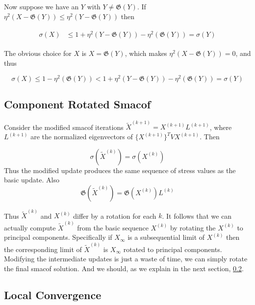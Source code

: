 \documentclass[
  12pt,
]{book}
\theoremstyle{definition}
\theoremstyle{definition}
\theoremstyle{definition}
\theoremstyle{definition}
\theoremstyle{remark}
\begin{document}
Now suppose we have an \(Y\) with \(Y\not=\mathfrak{G}(Y)\). If \(\eta^2(X-\mathfrak{G}(Y))\leq\eta^2(Y-\mathfrak{G}(Y))\) then

\begin{align}
\begin{split}
\sigma(X)%
&\leq 1+\eta^2(Y-\mathfrak{G}(Y))-\eta^2(\mathfrak{G}(Y))=\sigma(Y)
\end{split}
\label{eq:upbmajimp}
\end{align}

The obvious choice for \(X\) is \(X=\mathfrak{G}(Y)\), which makes \(\eta^2(X-\mathfrak{G}(Y))=0\), and thus

\begin{equation}
\sigma(X)\leq 1-\eta^2(\mathfrak{G}(Y))<
1+\eta^2(Y-\mathfrak{G}(Y))-\eta^2(\mathfrak{G}(Y))=\sigma(Y)
\label{eq:upbmajmin}
\end{equation}

\hypertarget{mincomprot}{%
\subsection{Component Rotated Smacof}\label{mincomprot}}

Consider the modified smacof iterations \(\tilde X^{(k+1)}=X^{(k+1)}L^{(k+1)}\), where \(L^{(k+1)}\) are the normalized eigenvectors of \(\{X^{(k+1)}\}^TVX^{(k+1)}\). Then

\[
\sigma(\tilde X^{(k)})=\sigma(X^{(k)})
\]
Thus the modified update produces the same sequence of stress values as the basic update. Also
\[
\mathfrak{G}(\tilde X^{(k)})=\mathfrak{G}(X^{(k)})L^{(k)}
\]

Thus \(\tilde X^{(k)}\) and \(X^{(k)}\) differ by a rotation for each \(k\). It follows that
we can actually compute \(\tilde X^{(k)}\) from the basic sequence \(X^{(k)}\) by rotating
the \(X^{(k)}\) to principal components. Specifically if \(X_\infty\) is a subsequential
limit of \(X^{(k)}\) then the corresponding limit of \(\tilde X^{(k)}\) is \(X_\infty\) rotated to principal components. Modifying the intermediate updates is just a waste of time, we
can simply rotate the final smacof solution. And we should, as we explain in the next section, \ref{minlocconv}.

\hypertarget{minlocconv}{%
\subsection{Local Convergence}\label{minlocconv}}
\end{document}

